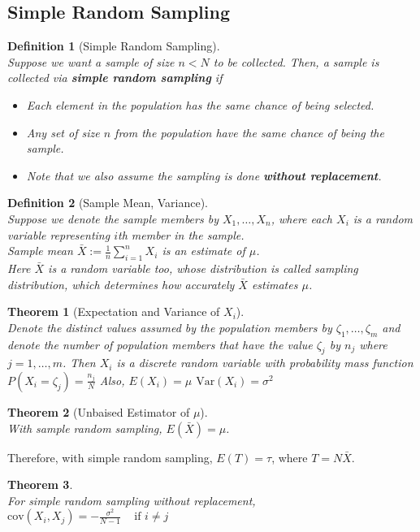 \documentclass[12pt]{article}
\newcommand{\var}{\mathrm{Var}}
\newcommand{\cov}{\mathrm{cov}}
\newtheorem{definition}{Definition}[section]
\newtheorem{theorem}{Theorem}[section]
\theoremstyle{definition}
\begin{document}
\subsection{Simple Random Sampling}
\begin{definition}[Simple Random Sampling]
\hfill\\\normalfont Suppose we want a sample of size $n<N$ to be collected. Then, a sample is collected via \textbf{simple random sampling} if
\begin{itemize}
  \item Each element in the population has the same chance of being selected.
  \item Any set of size $n$ from the population have the same chance of being the sample.
  \item Note that we also assume the sampling is done \textbf{without replacement}.
\end{itemize}
\end{definition}
\begin{definition}[Sample Mean, Variance]
\hfill\\\normalfont Suppose we denote the sample members by $X_1,\ldots, X_n$, where each $X_i$ is a random variable representing $i$th member in the sample.\\
Sample mean $\bar{X}:=\frac{1}{n}\sum_{i=1}^n X_i$ is an estimate of $\mu$.\\
Here $\bar{X}$ is a random variable too, whose distribution is called sampling distribution, which determines how accurately $\bar{X}$ estimates $\mu$.
\end{definition}
\begin{theorem}[Expectation and Variance of {$X_i$}]
\hfill\\\normalfont Denote the distinct values assumed by the population members by $\zeta_1,\ldots,\zeta_m$ and denote the number of population members that have the value $\zeta_j$ by $n_j$ where $j=1,\ldots, m$. Then $X_i$ is a discrete random variable with probability mass function 
$
P(X_i=\zeta_j) = \frac{n_j}{N}
$
Also,
$
E(X_i) = \mu
$
$
\var(X_i)=\sigma^2
$
\end{theorem}
\begin{theorem}[Unbaised Estimator of {$\mu$}]
\hfill\\\normalfont With sample random sampling, $E(\bar{X})=\mu$.
\end{theorem}
Therefore, with simple random sampling, $E(T)=\tau$, where $T=N\bar{X}$.
\begin{theorem}
\hfill\\\normalfont For simple random sampling without replacement,\\
$
\cov(X_i,X_j) = -\frac{\sigma^2}{N-1}\;\;\;\text{ if }i\neq j
$
\end{theorem}
\end{document}
